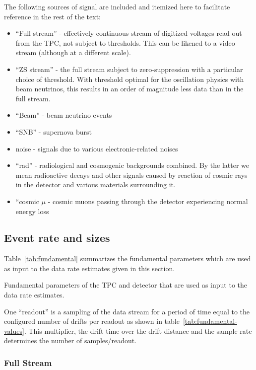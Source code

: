 The following sources of signal are included and itemized here to
facilitate reference in the rest of the text:
\begin{itemize}
\item ``Full stream'' - effectively continuous stream of digitized
  voltages read out from the TPC, not subject to thresholds.
  This can be likened to a video stream (although at a different
  scale).
\item ``ZS stream'' - the full stream subject to zero-suppression with
  a particular choice of threshold.
  With threshold optimal for the oscillation physics with beam
  neutrinos, this results in an order of magnitude less data than in
  the full stream.
\item ``Beam'' - beam neutrino events
\item ``SNB'' - supernova burst
\item noise - signals due to various electronic-related noises
\item ``rad'' - radiological and cosmogenic backgrounds combined.
  By the latter we mean radioactive decays and other signals caused by
  reaction of cosmic rays in the detector and various materials
  surrounding it.
\item ``cosmic $\mu$ - cosmic muons passing through the detector
  experiencing normal energy loss
\end{itemize}

\subsection{Event rate and sizes}

Table~\ref{tab:fundamental} summarizes the fundamental parameters
which are used as input to the data rate estimates given in this
section.

\begin{table}[htbp]
  \centering
  \caption{Fundamental parameters of the TPC and detector that are used as input to the data rate estimates.}
  
  \label{tab:fundamental}
\end{table}

One ``readout'' is a sampling of the data stream for a period of time
equal to the configured number of drifts per readout as shown in
table~\ref{tab:fundamental-values}.
This multiplier, the drift time over the drift distance and the sample
rate determines the number of samples/readout.


\subsubsection{Full Stream}

